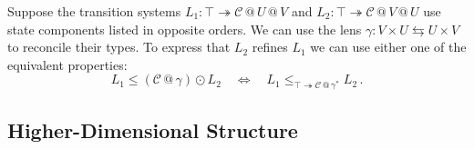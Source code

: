 \documentclass[acmsmall,screen,review,anonymous]{acmart}
\newcommand{\que}{\circ}
\newcommand{\ans}{\bullet}
\newcommand{\lensarrow}{\leftrightarrows}
\begin{document}
\begin{example}
Suppose the transition systems
$L_1 : \top \twoheadrightarrow \mathcal{C} \mathbin@ U \mathbin@ V$ and
$L_2 : \top \twoheadrightarrow \mathcal{C} \mathbin@ V \mathbin@ U$
use state components listed in opposite orders.
We can use the lens
$\gamma : V \times U \lensarrow U \times V$
to reconcile their types.
To express that $L_2$ refines $L_1$ we can
use either one of the equivalent properties:
\[
  L_1
    \le
    (\mathcal{C} \mathbin@ \gamma) \odot L_2
  \quad \iff \quad
  L_1
    \le_{\top \twoheadrightarrow \mathcal{C} \mathbin@ \gamma^*}
    L_2
  \,.
\]
\end{example}


%
%


\subsection{Higher-Dimensional Structure} \label{sec:overview:high-dimension} %
\end{document}
